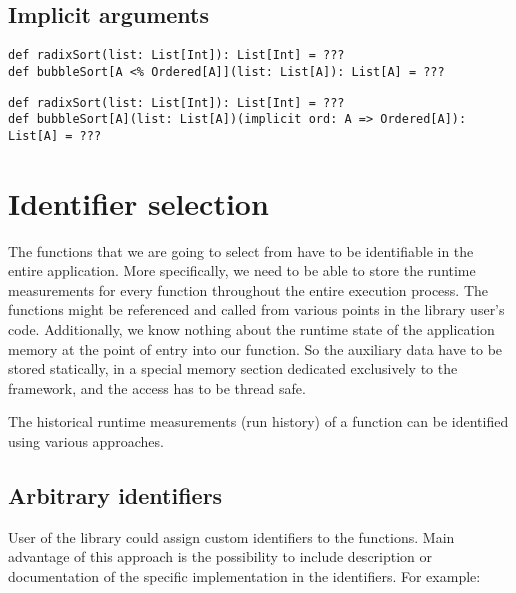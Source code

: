 \subsection{Implicit arguments}


\lstset{language=Scala}
\begin{lstlisting}
def radixSort(list: List[Int]): List[Int] = ???
def bubbleSort[A <% Ordered[A]](list: List[A]): List[A] = ???
\end{lstlisting}

\lstset{language=Scala}
\begin{lstlisting}
def radixSort(list: List[Int]): List[Int] = ???
def bubbleSort[A](list: List[A])(implicit ord: A => Ordered[A]): List[A] = ???
\end{lstlisting}



\section{Identifier selection}

The functions that we are going to select from have to be identifiable in the entire application. More specifically, we need to be able to store the runtime measurements for every function throughout the entire execution process. The functions might be referenced and called from various points in the library user's code. Additionally, we know nothing about the runtime state of the application memory at the point of entry into our function. So the auxiliary data have to be stored statically, in a special memory section dedicated exclusively to the framework, and the access has to be thread safe.


The historical runtime measurements (run history) of a function can be identified using various approaches.

\subsection{Arbitrary identifiers}
User of the library could assign custom identifiers to the functions. Main advantage of this approach is the possibility to include description or documentation of the specific implementation in the identifiers. For example:


